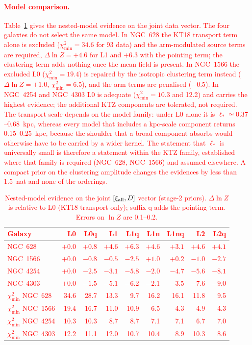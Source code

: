 \documentclass[fleqn,usenatbib]{mnras}
\newcommand{\revadd}[1]{\textcolor{red}{#1}}
\begin{document}
\revadd{\paragraph*{Model comparison.}  Table~\ref{tab:phangs_evidence} gives the nested-model evidence on the joint data vector.  The four galaxies do not select the same model.  In NGC~628 the KT18 transport term alone is excluded ($\chi^2_{\min}=34.6$ for 93 data) and the arm-modulated source terms are required, $\Delta\ln Z=+4.6$ for L1 and $+6.3$ with the pointing term; the clustering term adds nothing once the mean field is present.  In NGC~1566 the excluded L0 ($\chi^2_{\min}=19.4$) is repaired by the isotropic clustering term instead ($\Delta\ln Z=+1.0$, $\chi^2_{\min}=6.5$), and the arm terms are penalised ($-0.5$).  In NGC~4254 and NGC~4303 L0 is adequate ($\chi^2_{\min}=10.3$ and 12.2) and carries the highest evidence; the additional KTZ components are tolerated, not required.  The transport scale depends on the model family: under L0 alone it is $\ell_\ast\simeq0.37$--0.68~kpc, whereas every model that includes a kpc-scale component returns 0.15--0.25~kpc, because the shoulder that a broad component absorbs would otherwise have to be carried by a wider kernel.  The statement that $\ell_\ast$ is universally small is therefore a statement within the KTZ family, established where that family is required (NGC~628, NGC~1566) and assumed elsewhere.  A compact prior on the clustering amplitude changes the evidences by less than 1.5~nat and none of the orderings.}

\revadd{\begin{table}
\centering
\scriptsize
\setlength{\tabcolsep}{2.5pt}
\caption{Nested-model evidence on the joint $[\xi_{\rm all},D]$ vector (stage-2 priors).  $\Delta\ln Z$ is relative to L0 (KT18 transport only); suffix q adds the pointing term.  Errors on $\ln Z$ are 0.1--0.2.}
\label{tab:phangs_evidence}
\begin{tabular}{@{}lrrrrrrrr@{}}
\toprule
Galaxy & L0 & L0q & L1 & L1q & L1n & L1nq & L2 & L2q\\
\midrule
NGC~628 & $+0.0$ & $+0.8$ & $+4.6$ & $+6.3$ & $+4.6$ & $+3.1$ & $+4.6$ & $+4.1$\\
NGC~1566 & $+0.0$ & $-0.8$ & $-0.5$ & $-2.5$ & $+1.0$ & $+0.2$ & $-1.0$ & $-2.7$\\
NGC~4254 & $+0.0$ & $-2.5$ & $-3.1$ & $-5.8$ & $-2.0$ & $-4.7$ & $-5.6$ & $-8.1$\\
NGC~4303 & $+0.0$ & $-1.5$ & $-5.1$ & $-6.2$ & $-2.1$ & $-3.5$ & $-7.6$ & $-9.0$\\
\midrule
$\chi^2_{\min}$ NGC~628 & 34.6 & 28.7 & 13.3 & 9.7 & 16.2 & 16.1 & 11.8 & 9.5\\
$\chi^2_{\min}$ NGC~1566 & 19.4 & 16.7 & 11.0 & 10.9 & 6.5 & 4.3 & 4.9 & 4.3\\
$\chi^2_{\min}$ NGC~4254 & 10.3 & 10.3 & 8.7 & 8.7 & 7.1 & 7.1 & 6.7 & 7.0\\
$\chi^2_{\min}$ NGC~4303 & 12.2 & 11.1 & 12.0 & 10.7 & 10.4 & 8.9 & 10.3 & 8.6\\
\bottomrule
\end{tabular}
\end{table}}
\end{document}

